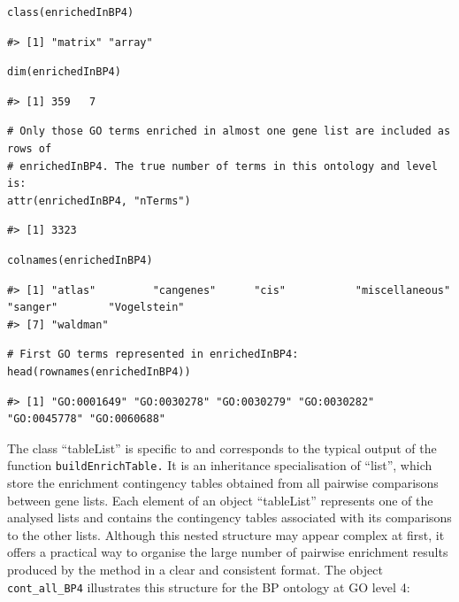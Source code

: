 \begin{verbatim}
class(enrichedInBP4)
\end{verbatim}

\begin{verbatim}
#> [1] "matrix" "array"
\end{verbatim}

\begin{verbatim}
dim(enrichedInBP4)
\end{verbatim}

\begin{verbatim}
#> [1] 359   7
\end{verbatim}

\begin{verbatim}
# Only those GO terms enriched in almost one gene list are included as rows of 
# enrichedInBP4. The true number of terms in this ontology and level is:
attr(enrichedInBP4, "nTerms")
\end{verbatim}

\begin{verbatim}
#> [1] 3323
\end{verbatim}

\begin{verbatim}
colnames(enrichedInBP4)
\end{verbatim}

\begin{verbatim}
#> [1] "atlas"         "cangenes"      "cis"           "miscellaneous" "sanger"        "Vogelstein"   
#> [7] "waldman"
\end{verbatim}

\begin{verbatim}
# First GO terms represented in enrichedInBP4:
head(rownames(enrichedInBP4))
\end{verbatim}

\begin{verbatim}
#> [1] "GO:0001649" "GO:0030278" "GO:0030279" "GO:0030282" "GO:0045778" "GO:0060688"
\end{verbatim}

The class ``tableList'' is specific to  and corresponds to the typical output of the function \texttt{buildEnrichTable.} It is an inheritance specialisation of ``list'', which store the enrichment contingency tables obtained from all pairwise comparisons between gene lists. Each element of an object ``tableList'' represents one of the analysed lists and contains the contingency tables associated with its comparisons to the other lists. Although this nested structure may appear complex at first, it offers a practical way to organise the large number of pairwise enrichment results produced by the method in a clear and consistent format. The object \texttt{cont\_all\_BP4} illustrates this structure for the BP ontology at GO level 4:

